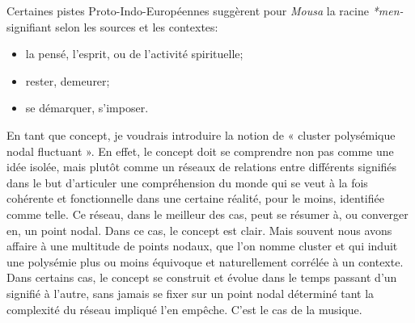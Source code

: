 \documentclass{article}
\begin{document}
Certaines pistes Proto-Indo-Européennes suggèrent pour \textit{Mousa} la racine \textit{*men-} signifiant selon les sources et les contextes:
\begin{itemize}
\item la pensé,  l'esprit, ou de l'activité spirituelle;
\item rester, demeurer;
\item se démarquer, s'imposer.
\end{itemize}

\bigskip

En tant que concept, je voudrais introduire la notion de « cluster polysémique nodal fluctuant ». En effet, le concept doit se comprendre non pas comme une idée isolée, mais plutôt comme un réseaux de relations entre différents signifiés dans le but d'articuler une compréhension du monde qui se veut à la fois cohérente et fonctionnelle dans une certaine réalité, pour le moins, identifiée comme telle. Ce réseau, dans le meilleur des cas, peut se résumer à, ou converger en, un point nodal. Dans ce cas, le concept est clair. Mais souvent nous avons affaire à une multitude de points nodaux, que l'on nomme cluster et qui induit une  polysémie plus ou moins équivoque et naturellement corrélée  à un contexte. %
Dans certains cas, le concept se construit et évolue dans le temps passant d'un signifié à l'autre, sans jamais se fixer sur un point nodal déterminé tant la complexité du réseau impliqué l'en empêche. C'est le cas de la musique.
\end{document}
